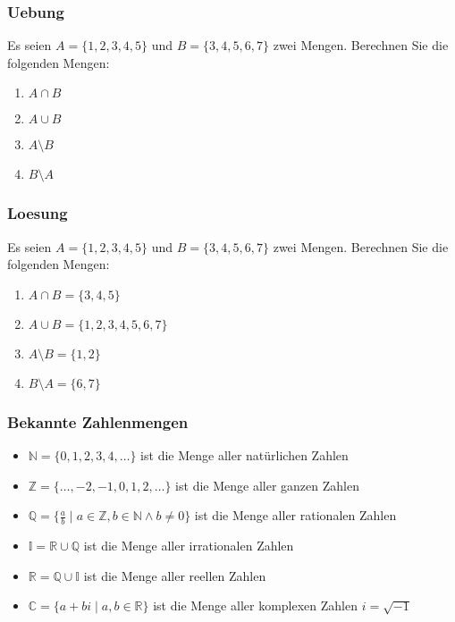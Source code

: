 \begin{frame}
    \frametitle{Uebung}
    Es seien $A = \{1,2,3,4,5\}$ und $B = \{3,4,5,6,7\}$ zwei Mengen.
    Berechnen Sie die folgenden Mengen:
    \begin{enumerate}
        \vfill \item $A \cap B$
        \vfill \item $A \cup B$
        \vfill \item $A \setminus B$
        \vfill \item $B \setminus A$
    \end{enumerate}
\end{frame}

\begin{frame}
    \frametitle{Loesung}
    Es seien $A = \{1,2,3,4,5\}$ und $B = \{3,4,5,6,7\}$ zwei Mengen.
    Berechnen Sie die folgenden Mengen:
    \begin{enumerate}
        \vfill \item $A \cap B = \{3,4,5\}$
        \vfill \item $A \cup B = \{1,2,3,4,5,6,7\}$
        \vfill \item $A \setminus B = \{1,2\}$
        \vfill \item $B \setminus A = \{6,7\}$
    \end{enumerate}
\end{frame}

\begin{frame}
    \frametitle{Bekannte Zahlenmengen}
    \begin{itemize}
        \vfill \item $\mathbb{N} = \{0,1,2,3,4, \dots\}$ ist die Menge aller natürlichen Zahlen
        \vfill \item $\mathbb{Z} = \{\dots, -2, -1, 0, 1, 2, \dots\}$ ist die Menge aller ganzen Zahlen
        \vfill \item $\mathbb{Q} = \{\frac{a}{b} \mid a \in \mathbb{Z}, b \in \mathbb{N} \wedge b \neq 0\}$ ist die Menge aller rationalen Zahlen
        \vfill \item $\mathbb{I} = \mathbb{R} \cup \mathbb{Q}$ ist die Menge aller irrationalen Zahlen
        \vfill \item $\mathbb{R} = \mathbb{Q} \cup \mathbb{I}$ ist die Menge aller reellen Zahlen
        \vfill \item $\mathbb{C} = \{a + bi \mid a, b \in \mathbb{R}\}$ ist die Menge aller komplexen Zahlen $i = \sqrt{-1}$
    \end{itemize}
\end{frame}
